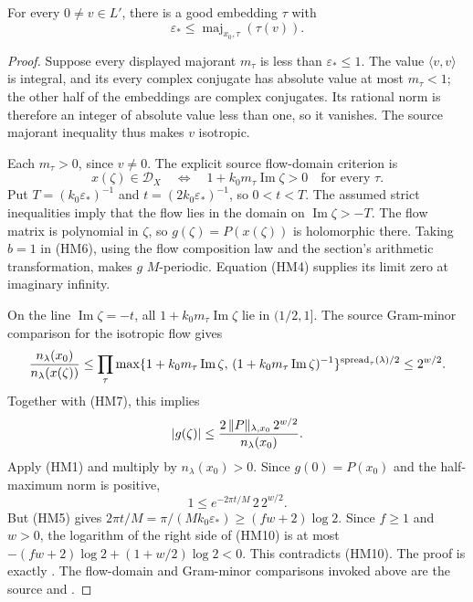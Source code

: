 \begin{srproposition}\label{prop:sr-source-maxbound}
For every \(0\ne v\in L'\), there is a good embedding \(\tau\)
with
\[
                 \varepsilon_*
                  \le\operatorname{maj}_{x_0,\tau}(\tau(v)).
 \tag{HM8}\label{eq:sr-source-maxbound}
\]
\end{srproposition}
\begin{proof}
Suppose every displayed majorant \(m_\tau\) is
less than \(\varepsilon_*\le1\).
The value \(\langle v,v\rangle\) is integral, and its every
complex conjugate has absolute value at most \(m_\tau<1\);
the other half of the embeddings are complex conjugates.
Its rational norm is therefore an integer of absolute value
less than one, so it vanishes.
The source majorant inequality thus makes \(v\) isotropic.

Each \(m_\tau>0\), since \(v\ne0\).
The explicit source flow-domain criterion is
\[
 x(\zeta)\in\mathcal D_X
      \quad\Longleftrightarrow\quad
                 1+k_0m_\tau\operatorname{Im}\zeta>0
                       \quad\text{for every }\tau .
 \tag{HM9}\label{eq:sr-source-flow-domain}
\]
Put \(T=(k_0\varepsilon_*)^{-1}\) and
\(t=(2k_0\varepsilon_*)^{-1}\), so \(0<t<T\).
The assumed strict inequalities imply that the flow lies
in the domain on \(\operatorname{Im}\zeta>-T\).
The flow matrix is polynomial in \(\zeta\), so
\(g(\zeta)=P(x(\zeta))\) is holomorphic there.
Taking \(b=1\) in (HM6), using the flow composition law and
the section's arithmetic transformation, makes \(g\)
\(M\)-periodic.
Equation (HM4) supplies its limit zero at imaginary infinity.

On the line \(\operatorname{Im}\zeta=-t\), all
\(1+k_0m_\tau\operatorname{Im}\zeta\) lie in \((1/2,1]\).
The source Gram-minor comparison for the isotropic flow gives
\[
 {n_\lambda(x_0)\over n_\lambda(x(\zeta))}
 \le\prod_\tau
   \max\{1+k_0m_\tau\operatorname{Im}\zeta,\,
             (1+k_0m_\tau\operatorname{Im}\zeta)^{-1}\}
                           ^{\operatorname{spread}_\tau(\lambda)/2}
 \le2^{w/2}.
\]
Together with (HM7), this implies
\[
     |g(\zeta)|\le
           {2\,\|P\|_{\lambda,x_0}\,2^{w/2}\over n_\lambda(x_0)}.
\]
Apply (HM1) and multiply by \(n_\lambda(x_0)>0\).
Since \(g(0)=P(x_0)\) and the half-maximum norm is positive,
\[
                  1\le e^{-2\pi t/M}\,2\,2^{w/2}.
 \tag{HM10}\label{eq:sr-source-maxbound-contradiction}
\]
But (HM5) gives
\(2\pi t/M=\pi/(Mk_0\varepsilon_*)\ge(fw+2)\log2\).
Since \(f\ge1\) and \(w>0\), the logarithm of the right side
of (HM10) is at most
\(-(fw+2)\log2+(1+w/2)\log2<0\).
This contradicts (HM10).
The proof is exactly .
The flow-domain and Gram-minor comparisons invoked above are the
source  and .
\end{proof}


